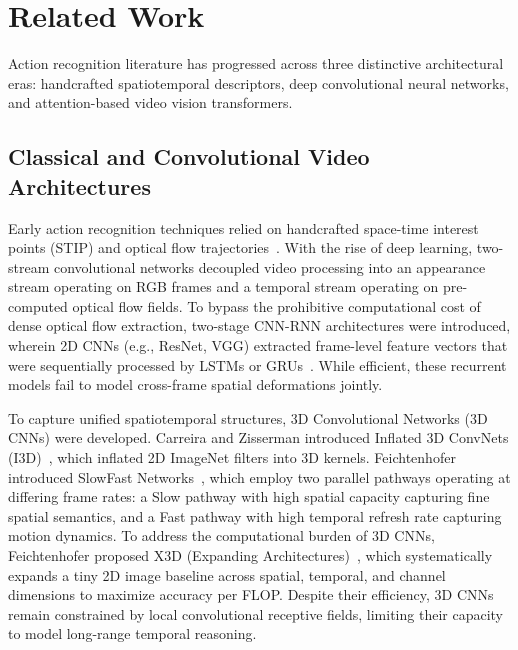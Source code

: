 \section{Related Work}
\label{sec:related_work}

Action recognition literature has progressed across three distinctive architectural eras: handcrafted spatiotemporal descriptors, deep convolutional neural networks, and attention-based video vision transformers.

\subsection{Classical and Convolutional Video Architectures}
Early action recognition techniques relied on handcrafted space-time interest points (STIP) and optical flow trajectories~\cite{rodriguez2008action}. With the rise of deep learning, two-stream convolutional networks decoupled video processing into an appearance stream operating on RGB frames and a temporal stream operating on pre-computed optical flow fields. To bypass the prohibitive computational cost of dense optical flow extraction, two-stage CNN-RNN architectures were introduced, wherein 2D CNNs (e.g., ResNet, VGG) extracted frame-level feature vectors that were sequentially processed by LSTMs or GRUs~\cite{donahue2015long}. While efficient, these recurrent models fail to model cross-frame spatial deformations jointly.

To capture unified spatiotemporal structures, 3D Convolutional Networks (3D CNNs) were developed. Carreira and Zisserman introduced Inflated 3D ConvNets (I3D)~\cite{carreira2017i3d}, which inflated 2D ImageNet filters into 3D kernels. Feichtenhofer \etal{} introduced SlowFast Networks~\cite{feichtenhofer2019slowfast}, which employ two parallel pathways operating at differing frame rates: a Slow pathway with high spatial capacity capturing fine spatial semantics, and a Fast pathway with high temporal refresh rate capturing motion dynamics. To address the computational burden of 3D CNNs, Feichtenhofer proposed X3D (Expanding Architectures)~\cite{feichtenhofer2020x3d}, which systematically expands a tiny 2D image baseline across spatial, temporal, and channel dimensions to maximize accuracy per FLOP. Despite their efficiency, 3D CNNs remain constrained by local convolutional receptive fields, limiting their capacity to model long-range temporal reasoning.

